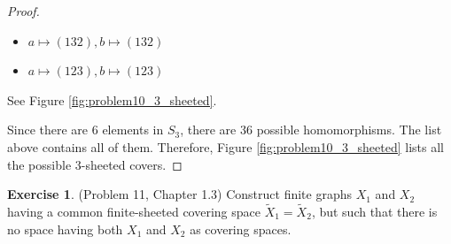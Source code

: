 \documentclass[12pt, psamsfonts]{amsart}
\theoremstyle{definition}
\newtheorem*{exer}{Exercise}
\theoremstyle{remark}
\numberwithin{equation}{section}
\begin{document}
\begin{proof}
\begin{itemize}
      \begin{itemize}
        \item $a \mapsto (132), b \mapsto (132)$
        \item $a \mapsto (123), b \mapsto (123)$
      \end{itemize}
      See Figure \ref{fig:problem10_3_sheeted}.
  \end{itemize}
  Since there are 6 elements in $S_3$, there are 36 possible homomorphisms.
  The list above contains all of them.
  Therefore, Figure \ref{fig:problem10_3_sheeted} lists all the possible 3-sheeted covers.
\end{proof}

\begin{exer}{(Problem 11, Chapter 1.3)}
  Construct finite graphs $X_1$ and $X_2$ having a common finite-sheeted covering space $\tilde{X}_1 = \tilde{X}_2$, but such that there is no space having both $X_1$ and $X_2$ as covering spaces.
\end{exer}
\end{document}
